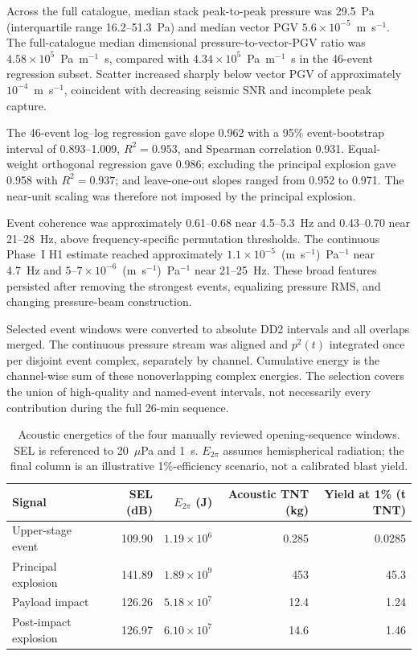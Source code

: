 \documentclass[]{seismica}
\begin{document}
Across the full catalogue, median stack peak-to-peak pressure was 29.5~Pa
(interquartile range 16.2--51.3~Pa) and median vector PGV
$5.6\times10^{-5}$~m~s$^{-1}$. The full-catalogue median dimensional
pressure-to-vector-PGV ratio was
$4.58\times10^5$~Pa~m$^{-1}$~s, compared with
$4.34\times10^5$~Pa~m$^{-1}$~s in the 46-event regression subset. Scatter
increased sharply below vector PGV of approximately $10^{-4}$~m~s$^{-1}$,
coincident with decreasing seismic SNR and incomplete peak capture.

The 46-event log--log regression gave slope 0.962 with a 95\% event-bootstrap
interval of 0.893--1.009, $R^2=0.953$, and Spearman correlation 0.931.
Equal-weight orthogonal regression gave 0.986; excluding the principal
explosion gave 0.958 with $R^2=0.937$; and leave-one-out slopes ranged from
0.952 to 0.971. The near-unit scaling was therefore not imposed by the
principal explosion.

Event coherence was approximately 0.61--0.68 near 4.5--5.3~Hz and
0.43--0.70 near 21--28~Hz, above frequency-specific permutation thresholds.
The continuous Phase~I H1 estimate reached approximately
$1.1\times10^{-5}$~(m~s$^{-1}$)~Pa$^{-1}$ near 4.7~Hz and
$5$--$7\times10^{-6}$~(m~s$^{-1}$)~Pa$^{-1}$ near 21--25~Hz. These broad
features persisted after removing the strongest events, equalizing pressure
RMS, and changing pressure-beam construction.

Selected event windows were converted to absolute DD2 intervals and all
overlaps merged. The continuous pressure stream was aligned and $p^2(t)$
integrated once per disjoint event complex, separately by channel. Cumulative
energy is the channel-wise sum of these nonoverlapping complex energies. The
selection covers the union of high-quality and named-event intervals, not
necessarily every contribution during the full 26-min sequence.

\begin{table}[!tbp]
\centering
\small
\caption{Acoustic energetics of the four manually reviewed opening-sequence
windows. SEL is referenced to 20~$\mu$Pa and 1~s. $E_{2\pi}$ assumes
hemispherical radiation; the final column is an illustrative 1\%-efficiency
scenario, not a calibrated blast yield.}
\label{tab:supp_energetics}
\begin{tabular}{lrrrr}
\hline
Signal & SEL (dB) & $E_{2\pi}$ (J) & Acoustic TNT (kg) & Yield at 1\% (t TNT) \\
\hline
Upper-stage event & 109.90 & $1.19\times10^6$ & 0.285 & 0.0285 \\
Principal explosion & 141.89 & $1.89\times10^9$ & 453 & 45.3 \\
Payload impact & 126.26 & $5.18\times10^7$ & 12.4 & 1.24 \\
Post-impact explosion & 126.97 & $6.10\times10^7$ & 14.6 & 1.46 \\
\hline
\end{tabular}
\end{table}
\end{document}
